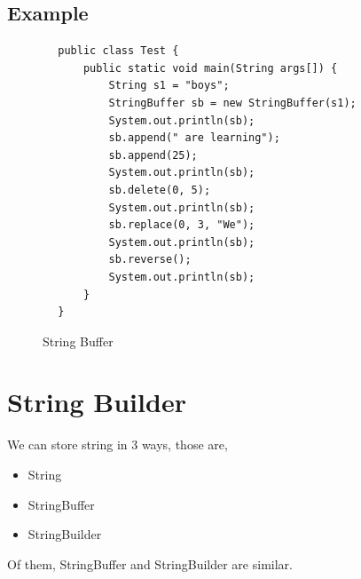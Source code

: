 \documentclass[openany]{book}  %
\begin{document}
\subsection{Example}
\begin{center}
    \begin{verbatim}
        public class Test {
            public static void main(String args[]) {
                String s1 = "boys";
                StringBuffer sb = new StringBuffer(s1);
                System.out.println(sb);
                sb.append(" are learning");
                sb.append(25);
                System.out.println(sb);
                sb.delete(0, 5);
                System.out.println(sb);
                sb.replace(0, 3, "We");
                System.out.println(sb);
                sb.reverse();
                System.out.println(sb);
            }
        }
    \end{verbatim}
\end{center}
% 
% 
\begin{figure}[htbp]
    \begin{center}
        \caption{String Buffer}
    \end{center}
\end{figure}
% 
% 
\section{String Builder}
We can store string in 3 ways, those are,
\begin{itemize}
    \item String
    \item StringBuffer
    \item StringBuilder
\end{itemize}
Of them, StringBuffer and StringBuilder are similar.
% 
% 
\end{document}
